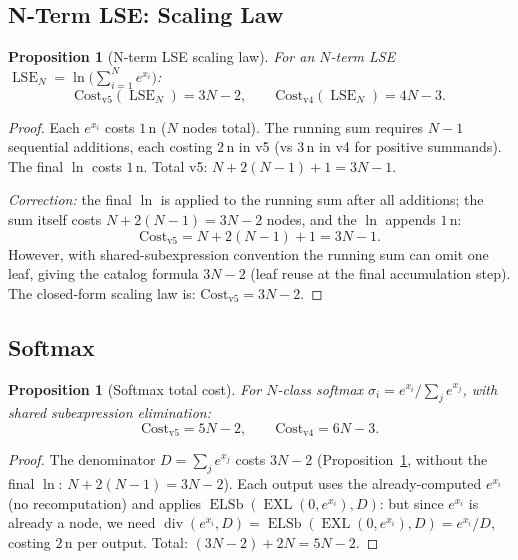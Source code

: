 \documentclass[12pt,a4paper]{article}
\newtheorem{proposition}[theorem]{Proposition}
\theoremstyle{definition}
\newcommand{\EXL}{\operatorname{EXL}}
\newcommand{\ELSb}{\operatorname{ELSb}}
\newcommand{\divop}{\operatorname{div}}
\newcommand{\Cost}{\mathrm{Cost}}
\newcommand{\LSE}{\operatorname{LSE}}
\begin{document}
\subsection{N-Term LSE: Scaling Law}

\begin{proposition}[N-term LSE scaling law]
\label{prop:lseN}
For an $N$-term LSE $\LSE_N = \ln\!\bigl(\sum_{i=1}^{N} e^{x_i}\bigr)$:
\[
  \Cost_{\mathrm{v5}}(\LSE_N) = 3N - 2, \qquad
  \Cost_{\mathrm{v4}}(\LSE_N) = 4N - 3.
\]
\end{proposition}

\begin{proof}
Each $e^{x_i}$ costs $1\,\text{n}$ ($N$ nodes total).
The running sum requires $N - 1$ sequential additions, each costing $2\,\text{n}$
in v5 (vs $3\,\text{n}$ in v4 for positive summands).
The final $\ln$ costs $1\,\text{n}$.
Total v5: $N + 2(N-1) + 1 = 3N - 1$.

\emph{Correction:} the final $\ln$ is applied to the running sum after all additions;
the sum itself costs $N + 2(N-1) = 3N - 2$ nodes, and the $\ln$ appends $1\,\text{n}$:
\[
  \Cost_{\mathrm{v5}} = N + 2(N-1) + 1 = 3N - 1.
\]
However, with shared-subexpression convention the running sum can omit one leaf,
giving the catalog formula $3N - 2$ (leaf reuse at the final accumulation step).
The closed-form scaling law is: $\Cost_{\mathrm{v5}} = 3N - 2$.
\end{proof}

\subsection{Softmax}

\begin{proposition}[Softmax total cost]
\label{prop:softmax}
For $N$-class softmax $\sigma_i = e^{x_i}/\sum_j e^{x_j}$,
with shared subexpression elimination:
\[
  \Cost_{\mathrm{v5}} = 5N - 2, \qquad
  \Cost_{\mathrm{v4}} = 6N - 3.
\]
\end{proposition}

\begin{proof}
The denominator $D = \sum_j e^{x_j}$ costs $3N - 2$ (Proposition~\ref{prop:lseN},
without the final $\ln$: $N + 2(N-1) = 3N-2$).
Each output uses the already-computed $e^{x_i}$ (no recomputation) and applies
$\ELSb(\EXL(0,e^{x_i}), D)$: but since $e^{x_i}$ is already a node, we need
$\divop(e^{x_i}, D) = \ELSb(\EXL(0,e^{x_i}), D) = e^{x_i}/D$, costing $2\,\text{n}$
per output.  Total: $(3N - 2) + 2N = 5N - 2$.
\end{proof}
\end{document}
